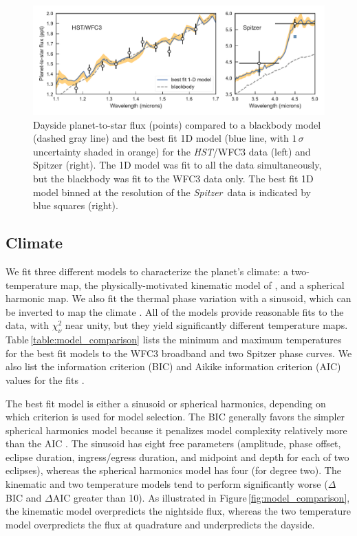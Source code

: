 \documentclass[twocolumn]{aastex61}
\newcommand{\project}[1]{\textsl{#1}}
\newcommand{\HST}{\project{HST}}
\newcommand{\Spitzer}{\project{Spitzer}}
\begin{document}
\begin{figure}
\includegraphics[width = 1.0\textwidth]{Figures/twopanel_dayside_spectrum.pdf}
\caption{Dayside planet-to-star flux (points) compared to a blackbody model (dashed gray line) and the best fit 1D model (blue line, with $1\,\sigma$ uncertainty shaded in orange) for the \HST/WFC3 data (left) and Spitzer (right). The 1D model was fit to all the data simultaneously, but the blackbody was fit to the WFC3 data only. The best fit 1D model binned at the resolution of the \Spitzer\ data is indicated by blue squares (right). } 
\label{fig:dayside}
\end{figure}


\subsection{Climate}
We fit three different models to characterize the planet's climate: a two-temperature map, the physically-motivated kinematic model of \cite{zhang17}, and a spherical harmonic map. We also fit the thermal phase variation with a sinusoid, which can be inverted to map the climate \citep{cowan08}.  All of the models provide reasonable fits to the data, with $\chi^2_\nu$ near unity, but they yield significantly different temperature maps. Table\,\ref{table:model_comparison} lists the minimum and maximum temperatures for the best fit models to the WFC3 broadband and two Spitzer phase curves. We also list the  information criterion (BIC) and Aikike information criterion (AIC) values for the fits \citep[a $\Delta$BIC value greater than 10 constitutes strong evidence against a given model;][]{kass95}.

The best fit model is either a sinusoid or spherical harmonics, depending on which criterion is used for model selection. The BIC generally favors the simpler spherical harmonics model because it penalizes model complexity relatively more than the AIC \citep{kass95}. The sinusoid has eight free parameters (amplitude, phase offset, eclipse duration, ingress/egress duration, and midpoint and depth for each of two eclipses), whereas the spherical harmonics model has four (for degree two).  The kinematic and two temperature models tend to perform significantly worse ($\Delta$BIC and $\Delta$AIC greater than 10).  As illustrated in Figure\,\ref{fig:model_comparison}, the kinematic model overpredicts the nightside flux, whereas the two temperature model overpredicts the flux at quadrature and underpredicts the dayside. 
\end{document}
